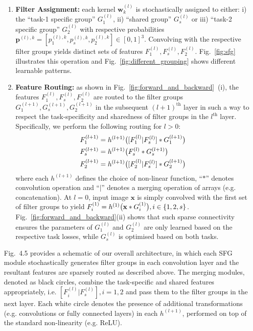 \begin{enumerate}
    \item \textbf{Filter Assignment:} each kernel $\mathbf{w}_{k}^{(l)}$ is stochastically assigned to either: i) the ``task-1 specific group'' $G^{(l)}_{1}$, ii) ``shared group'' $G^{(l)}_{s}$ or iii) ``task-2 specific group'' $G^{(l)}_{2}$ with respective probabilities $\mathbf{p}^{(l),k} = [p^{(l),k}_1, p^{(l),k}_{s}, p^{(l),k}_2] \in [0,1]^3$. Convolving with the respective filter groups yields distinct sets of features $F^{(l)}_1, F^{(l)}_{s}, F^{(l)}_{2}$. Fig.~\ref{fig:sfg} illustrates this operation and Fig.~\ref{fig:different_grouping} shows different learnable patterns. 
    
    \item \textbf{Feature Routing:} as shown in Fig.~\ref{fig:forward_and_backward}~(i), the features $F^{(l)}_1, F^{(l)}_{s}, F^{(l)}_{2}$ are routed to the filter groups $G_{1}^{(l+1)}, G_{s}^{(l+1)}, G_{2}^{(l+1)}$ in the subsequent $(l+1)^{\text{th}}$ layer in such a way to respect the task-specificity and sharedness of filter groups in the $l^{\text{th}}$ layer. Specifically, we perform the following routing for $l>0$: 
        \begin{align*}
        F^{(l+1)}_1 &= h^{(l+1)}\big{(}[F^{(l)}_1|F^{(l)}_{s}]*G^{(l+1)}_{1}\big{)}\\ 
        F^{(l+1)}_{s} &= h^{(l+1)}\big{(} F^{(l)}_{s}*G^{(l+1)}_{s}\big{)}\\ 
        F^{(l+1)}_2 &= h^{(l+1)}\big{(}[F^{(l)}_2|F^{(l)}_{s}]*G^{(l+1)}_{2}\big{)}
        \end{align*}
    where each $h^{(l+1)}$ defines the choice of non-linear function, ``$*$'' denotes convolution operation and ``$|$'' denotes a merging operation of arrays (e.g. concatenation). At $l=0$, input image $\mathbf{x}$ is simply convolved with the first set of filter groups to yield $F^{(1)}_{i} = h^{(1)}\big{(}\mathbf{x}*G^{(1)}_{i}\big{)}, i\in\{1,2,s\}$. Fig.~\ref{fig:forward_and_backward}(ii) shows that such sparse connectivity ensures the parameters of $G^{(l)}_{1}$ and $G^{(l)}_{2}$ are only learned based on the respective task losses, while $G^{(l)}_{s}$ is optimised based on both tasks. 
\end{enumerate}
    
    
Fig.~4.5 provides a schematic of our overall architecture, in which each SFG module stochastically generates filter groups in each convolution layer and the resultant features are sparsely routed as described above. The merging modules, denoted as black circles, combine the task-specific and shared features appropriately, i.e. $[F^{(l)}_{i}|F^{(l)}_{s}], i = 1,2$ and pass them to the filter groups in the next layer. Each white circle denotes the presence of additional transformations  (e.g. convolutions or fully connected layers) in each $h^{(l+1)}$, performed on top of the standard non-linearity (e.g. ReLU). 


